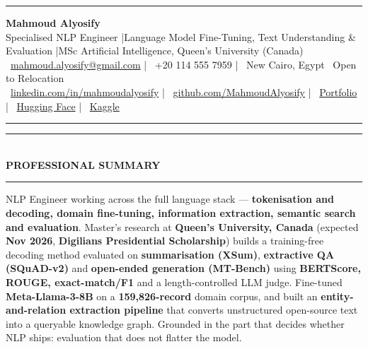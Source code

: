 \documentclass[10pt, a4paper]{article}
\newcommand{\faEnvelope}{}\newcommand{\faPhone}{}\newcommand{\faMapMarker}{}%
\newcommand{\faLinkedin}{}\newcommand{\faGithub}{}\newcommand{\faRobot}{}%
\newcommand{\faChartBar}{}\newcommand{\faGlobe}{}%
\newcommand{\cvsection}[1]{%
  \vspace{3pt}%
  {\color{navy}\rule{\linewidth}{1.1pt}}\\[0.5pt]%
  {\color{navy}\bfseries\fontsize{9.5}{11}\selectfont\uppercase{#1}}\\[-4pt]%
  {\color{teal}\rule{\linewidth}{0.6pt}}%
  \vspace{2pt}%
}
\begin{document}
\small

{\color{navy}\rule{\linewidth}{1.5pt}}

\vspace{3pt}
\begin{center}
  {\fontsize{21}{24}\bfseries\color{navy} Mahmoud Alyosify}\\[3pt]
  {\fontsize{10}{12}\color{teal}
    Specialised NLP Engineer \enspace|\enspace Language Model Fine-Tuning, Text Understanding \& Evaluation
    \enspace|\enspace MSc Artificial Intelligence, Queen's University (Canada)
}\\[4pt]
  {\color{midgray}
    \faEnvelope\ \href{mailto:mahmoud.alyosify@gmail.com}{mahmoud.alyosify@gmail.com}
    \enspace|\enspace
    \faPhone\ +20 114 555 7959
    \enspace|\enspace
    \faMapMarker\ New Cairo, Egypt \textperiodcentered\ Open to Relocation}\\[2pt]
  {\faLinkedin\ \href{https://linkedin.com/in/mahmoudalyosify}{linkedin.com/in/mahmoudalyosify}
    \enspace|\enspace
    \faGithub\ \href{https://github.com/MahmoudAlyosify}{github.com/MahmoudAlyosify}
    \enspace|\enspace
    \faGlobe\ \href{https://mahmoudalyosifysite.github.io/}{Portfolio}
    \enspace|\enspace
    \faRobot\ \href{https://huggingface.co/mahmoudalyosify}{Hugging Face}
    \enspace|\enspace
    \faChartBar\ \href{https://kaggle.com/mahmoudalyosify}{Kaggle}}
\end{center}

{\color{navy}\rule{\linewidth}{1.5pt}}

\vspace{2pt}

\cvsection{Professional Summary}

{\color{darkgray}\justifying
NLP Engineer working across the full language stack --- \textbf{tokenisation and decoding, domain fine-tuning, information extraction, semantic search and evaluation}. Master's research at \textbf{Queen's University, Canada} (expected \textbf{Nov 2026}, \textbf{Digilians Presidential Scholarship}) builds a training-free decoding method evaluated on \textbf{summarisation (XSum)}, \textbf{extractive QA (SQuAD-v2)} and \textbf{open-ended generation (MT-Bench)} using \textbf{BERTScore, ROUGE, exact-match/F1} and a length-controlled LLM judge. Fine-tuned \textbf{Meta-Llama-3-8B} on a \textbf{159,826-record} domain corpus, and built an \textbf{entity-and-relation extraction pipeline} that converts unstructured open-source text into a queryable knowledge graph. Grounded in the part that decides whether NLP ships: evaluation that does not flatter the model.}
\end{document}

